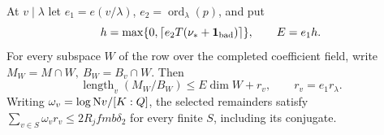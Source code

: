 


\begin{lemma}
At \(v\mid\lambda\) let \(e_1=e(v/\lambda)\),
\(e_2=\operatorname{ord}_\lambda(p)\), and put
\[
 h=\max\{0,\lceil e_2T(\nu_*+\mathbf1_{\rm bad})\rceil\},\qquad E=e_1h.
\]
For every subspace \(W\) of the row over the completed coefficient
field, write \(M_W=M\cap W,\ B_W=B_v\cap W\). Then
\begin{equation}\label{eq:run-cut}
 \operatorname{length}_v(M_W/B_W)\le E\dim W+r_v,\qquad r_v=e_1r_\lambda .
\end{equation}
Writing \(\omega_v=\log{\rm N}v/[K:Q]\), the selected remainders
satisfy \(\sum_{v\in S}\omega_v r_v\le2R_jfmb\delta_2\)
for every finite \(S\), including its conjugate.
\end{lemma}


